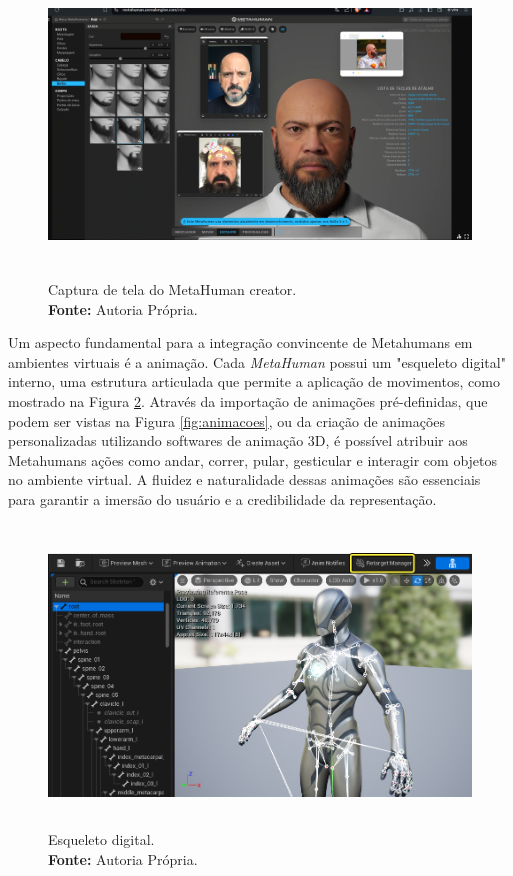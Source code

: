 \begin{figure}[H]
    \centering
    \includegraphics[height=8cm, keepaspectratio]{img/Metahuman.png}
    \caption{Captura de tela do MetaHuman creator. \\
        \textbf{Fonte:} Autoria Própria.}
    \label{fig:metahuman creator}
\end{figure}

Um aspecto fundamental para a integração convincente de Metahumans em ambientes virtuais é a animação. Cada \textit{MetaHuman} possui um "esqueleto digital" interno, uma estrutura articulada que permite a aplicação de movimentos, como mostrado na Figura \ref{fig:skeleton}. Através da importação de animações pré-definidas, que podem ser vistas na Figura \ref{fig:animacoes}, ou da criação de animações personalizadas utilizando softwares de animação 3D, é possível atribuir aos Metahumans ações como andar, correr, pular, gesticular e interagir com objetos no ambiente virtual. A fluidez e naturalidade dessas animações são essenciais para garantir a imersão do usuário e a credibilidade da representação.

\begin{figure}[H]
    \centering
    \includegraphics[height=8cm, keepaspectratio]{img/skeleton.png}
    \caption{Esqueleto digital.\\
        \textbf{Fonte:} Autoria Própria.}
    \label{fig:skeleton}
\end{figure}

